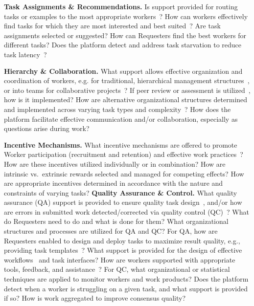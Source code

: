 \documentclass{sigchi}
\begin{document}
{\bf Task Assignments \& Recommendations.} Is support provided for routing tasks or examples to the most appropriate workers~\cite{Ho2012}? How can workers effectively find tasks for which they are most interested and best suited~\cite{chilton2010task,law2011effects}? Are task assignments selected or suggested? How can Requesters find the best workers for different tasks? Does the platform detect and address task starvation to reduce task latency~\cite{dean2008mapreduce}?
 
{\bf Hierarchy \& Collaboration.} What support allows effective organization and coordination of workers, e.g. for traditional, hierarchical management structures~\cite{kochhar2010anatomy,Nallapati13}, or into teams for collaborative projects~\cite{anagnostopoulos2012online}? If peer review or assessment is utilized~\cite{horton2010employer}, how is it implemented?  How are alternative organizational structures determined and implemented across varying task types and complexity~\cite{noronha2011platemate,Heer10,lasecki2012real}? How does the platform facilitate effective communication and/or collaboration, especially as questions arise during work? 

{\bf Incentive Mechanisms.} What incentive mechanisms are offered to promote Worker participation (recruitment and retention) and effective work practices~\cite{shaw2011designing}? How are these incentives utilized individually or in combination? How are intrinsic vs.\ extrinsic rewards selected and managed for competing effects? How are appropriate incentives determined in accordance with the nature and constraints of varying tasks? 
{\bf Quality Assurance \& Control.} What quality assurance (QA) support is provided to ensure quality task design~\cite{huang2010toward}, and/or how are errors in submitted work detected/corrected via quality control (QC)~\cite{smyth1995inferring}? 
What do Requesters need to do and what is done for them?  What organizational structures and processes are utilized for QA and QC? For QA, how are Requesters enabled to design and deploy tasks to maximize result quality, e.g., providing task templates~\cite{chen2011opportunities}? What support is provided for the design of effective workflows~\cite{little2009turkit} and task 
interfaces? 
How are workers supported with appropriate tools, feedback, and assistance~\cite{dow2012shepherding}? For QC, what organizational or statistical techniques are applied to monitor workers and work products? Does the platform detect when a worker is struggling on a given task, and what support is provided if so? How is work aggregated to improve consensus quality?  
 
\end{document}
